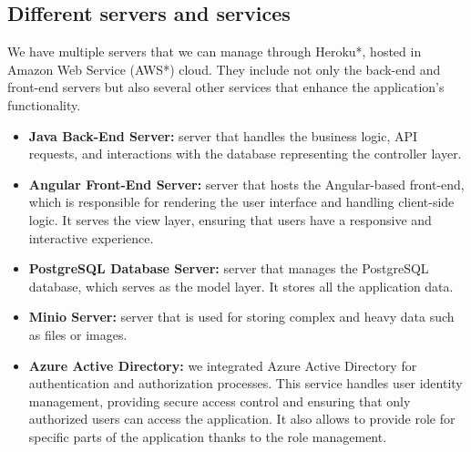 \documentclass[12pt,a4paper,table,english]{article}
\begin{document}
	
	\subsection{Different servers and services}
	
	We have multiple servers that we can manage through Heroku*, hosted in Amazon Web Service (AWS*) cloud. They include not only the back-end and front-end servers but also several other services that enhance the application's functionality.
	
	\begin{itemize}
		\item \textbf{Java Back-End Server:} server that handles the business logic, API requests, and interactions with the database representing the controller layer.
		
		\item \textbf{Angular Front-End Server:} server that hosts the Angular-based front-end, which is responsible for rendering the user interface and handling client-side logic. It serves the view layer, ensuring that users have a responsive and interactive experience.
		
		\item \textbf{PostgreSQL Database Server:} server that manages the PostgreSQL database, which serves as the model layer. It stores all the application data.
		
		\item \textbf{Minio Server:} server that is used for storing complex and heavy data such as files or images.
		
		\item \textbf{Azure Active Directory:} we integrated Azure Active Directory for authentication and authorization processes. This service handles user identity management, providing secure access control and ensuring that only authorized users can access the application. It also allows to provide role for specific parts of the application thanks to the role management.
		
	\end{itemize}

	
	
	
\end{document}
